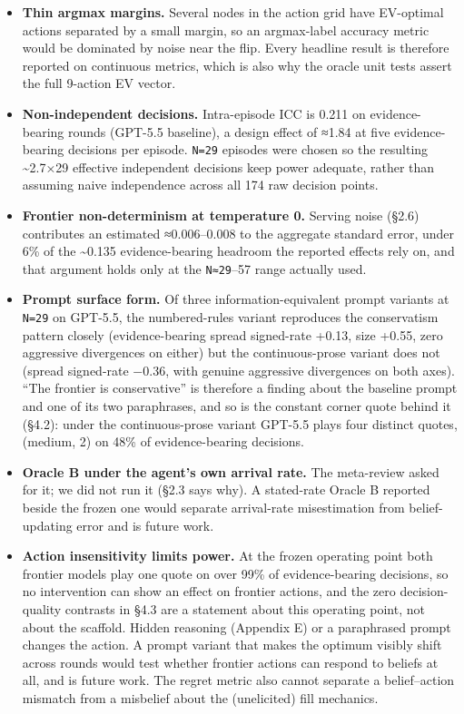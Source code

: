 \documentclass[
  10pt,
]{article}
\begin{document}
\begin{itemize}
\item
  \textbf{Thin argmax margins.} Several nodes in the action grid have EV-optimal actions separated by a small margin, so an argmax-label accuracy metric would be dominated by noise near the flip. Every headline result is therefore reported on continuous metrics, which is also why the oracle unit tests assert the full 9-action EV vector.
\item
  \textbf{Non-independent decisions.} Intra-episode ICC is 0.211 on evidence-bearing rounds (GPT-5.5 baseline), a design effect of ≈1.84 at five evidence-bearing decisions per episode. \texttt{N=29} episodes were chosen so the resulting \textasciitilde2.7×29 effective independent decisions keep power adequate, rather than assuming naive independence across all 174 raw decision points.
\item
  \textbf{Frontier non-determinism at temperature 0.} Serving noise (§2.6) contributes an estimated ≈0.006--0.008 to the aggregate standard error, under 6\% of the \textasciitilde0.135 evidence-bearing headroom the reported effects rely on, and that argument holds only at the \texttt{N≈29}--57 range actually used.
\item
  \textbf{Prompt surface form.} Of three information-equivalent prompt variants at \texttt{N=29} on GPT-5.5, the numbered-rules variant reproduces the conservatism pattern closely (evidence-bearing spread signed-rate +0.13, size +0.55, zero aggressive divergences on either) but the continuous-prose variant does not (spread signed-rate −0.36, with genuine aggressive divergences on both axes). ``The frontier is conservative'' is therefore a finding about the baseline prompt and one of its two paraphrases, and so is the constant corner quote behind it (§4.2): under the continuous-prose variant GPT-5.5 plays four distinct quotes, (medium, 2) on 48\% of evidence-bearing decisions.
\item
  \textbf{Oracle B under the agent's own arrival rate.} The meta-review asked for it; we did not run it (§2.3 says why). A stated-rate Oracle B reported beside the frozen one would separate arrival-rate misestimation from belief-updating error and is future work.
\item
  \textbf{Action insensitivity limits power.} At the frozen operating point both frontier models play one quote on over 99\% of evidence-bearing decisions, so no intervention can show an effect on frontier actions, and the zero decision-quality contrasts in §4.3 are a statement about this operating point, not about the scaffold. Hidden reasoning (Appendix E) or a paraphrased prompt changes the action. A prompt variant that makes the optimum visibly shift across rounds would test whether frontier actions can respond to beliefs at all, and is future work. The regret metric also cannot separate a belief--action mismatch from a misbelief about the (unelicited) fill mechanics.

\end{itemize}
\end{document}
